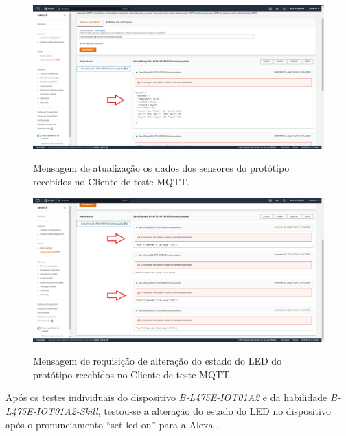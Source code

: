 \begin{figure}[htbp]
    \centering
    \caption{Mensagem de atualização os dados dos sensores do protótipo recebidos no Cliente de teste MQTT.}
    \includegraphics[scale=0.315]{Imagens/cliente_de_teste_mqtt_sensores.png}
    \label{fig:cliente_de_teste_mqtt_sensores}
\end{figure}

\begin{figure}[htbp]
    \centering
    \caption{Mensagem de requisição de alteração do estado do LED do protótipo recebidos no Cliente de teste MQTT.}
    \includegraphics[scale=0.315]{Imagens/cliente_de_teste_mqtt_led_state.png}
    \label{fig:cliente_de_teste_mqtt_led_state}
\end{figure}

Após os testes individuais do dispositivo \textit{B-L475E-IOT01A2} e da habilidade \textit{B-L475E-IOT01A2-Skill}, testou-se a alteração do estado do LED no dispositivo após o pronunciamento ``set led on'' para a Alexa \cite{ref:048}.
